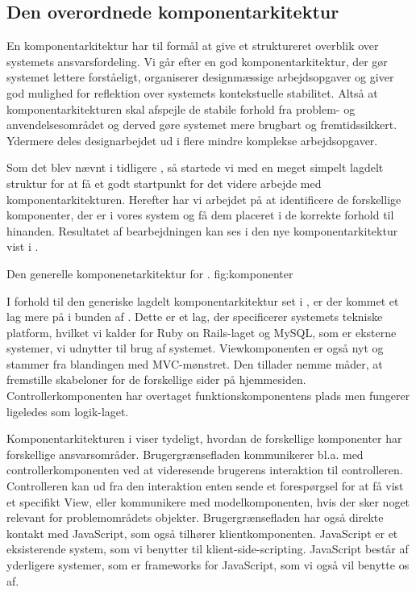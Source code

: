 \subsection{Den overordnede komponentarkitektur}
\label{sec:overordnetkomponent}
En komponentarkitektur har til formål at give et struktureret overblik over systemets ansvarsfordeling. Vi går efter en god komponentarkitektur, der gør systemet lettere forståeligt, organiserer designmæssige arbejdsopgaver og giver god mulighed for reflektion over systemets kontekstuelle stabilitet. Altså at komponentarkitekturen skal afspejle de stabile forhold fra problem- og anvendelsesområdet og derved gøre systemet mere brugbart og fremtidssikkert. Ydermere deles designarbejdet ud i flere mindre komplekse arbejdsopgaver.

Som det blev nævnt i tidligere , så startede vi med en meget simpelt lagdelt struktur for at få et godt startpunkt for det videre arbejde med komponentarkitekturen. Herefter har vi arbejdet på at identificere de forskellige komponenter, der er i vores system og få dem placeret i de korrekte forhold til hinanden. Resultatet af bearbejdningen kan ses i den nye komponentarkitektur vist i .

	{Den generelle komponenetarkitektur for \Foodl{}.}
	{fig:komponenter}

I forhold til den generiske lagdelt komponentarkitektur set i , er der kommet et lag mere på i bunden af . Dette er et lag, der specificerer systemets tekniske platform, hvilket vi kalder for Ruby on Rails-laget og MySQL, som er eksterne systemer, vi udnytter til brug af systemet. Viewkomponenten er også nyt og stammer fra blandingen med MVC-mønstret. Den tillader nemme måder, at fremstille skabeloner for de forskellige sider på hjemmesiden. Controllerkomponenten har overtaget funktionskomponentens plads men fungerer ligeledes som logik-laget.

Komponentarkitekturen i  viser tydeligt, hvordan de forskellige komponenter har forskellige ansvarsområder. Brugergrænsefladen kommunikerer bl.a. med controllerkomponenten ved at videresende brugerens interaktion til controlleren. Controlleren kan ud fra den interaktion enten sende et forespørgsel for at få vist et specifikt View, eller kommunikere med modelkomponenten, hvis der sker noget relevant for problemområdets objekter. Brugergrænsefladen har også direkte kontakt med JavaScript, som også tilhører klientkomponenten.  JavaScript er et eksisterende system, som vi benytter til klient-side-scripting. JavaScript består af yderligere systemer, som er frameworks for JavaScript, som vi også vil benytte os af.

